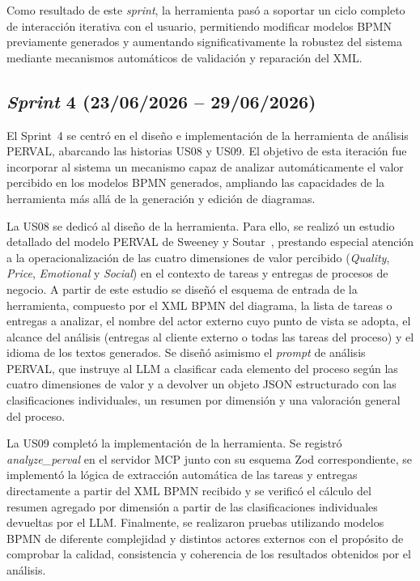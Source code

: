 Como resultado de este \textit{sprint}, la herramienta pasó a soportar un ciclo completo de interacción iterativa con el usuario, permitiendo modificar modelos BPMN previamente generados y aumentando significativamente la robustez del sistema mediante mecanismos automáticos de validación y reparación del XML.



\subsection{\textit{Sprint} 4 (23/06/2026 -- 29/06/2026)}
\label{subsec:sprint4}

El Sprint~4 se centró en el diseño e implementación de la herramienta de análisis PERVAL, abarcando las historias US08 y US09. El objetivo de esta iteración fue incorporar al sistema un mecanismo capaz de analizar automáticamente el valor percibido en los modelos BPMN generados, ampliando las capacidades de la herramienta más allá de la generación y edición de diagramas.

La US08 se dedicó al diseño de la herramienta. Para ello, se realizó un estudio detallado del modelo PERVAL de Sweeney y Soutar~\cite{sweeney2001perval}, prestando especial atención a la operacionalización de las cuatro dimensiones de valor percibido (\textit{Quality}, \textit{Price}, \textit{Emotional} y \textit{Social}) en el contexto de tareas y entregas de procesos de negocio. A partir de este estudio se diseñó el esquema de entrada de la herramienta, compuesto por el XML BPMN del diagrama, la lista de tareas o entregas a analizar, el nombre del actor externo cuyo punto de vista se adopta, el alcance del análisis (entregas al cliente externo o todas las tareas del proceso) y el idioma de los textos generados. Se diseñó asimismo el \textit{prompt} de análisis PERVAL, que instruye al LLM a clasificar cada elemento del proceso según las cuatro dimensiones de valor y a devolver un objeto JSON estructurado con las clasificaciones individuales, un resumen por dimensión y una valoración general del proceso.


La US09 completó la implementación de la herramienta. Se registró \textit{analyze\_perval} en el servidor MCP junto con su esquema Zod correspondiente, se implementó la lógica de extracción automática de las tareas y entregas directamente a partir del XML BPMN recibido y se verificó el cálculo del resumen agregado por dimensión a partir de las clasificaciones individuales devueltas por el LLM. Finalmente, se realizaron pruebas utilizando modelos BPMN de diferente complejidad y  distintos actores externos con el propósito de comprobar  la calidad,  consistencia y coherencia de los resultados obtenidos por el análisis.

